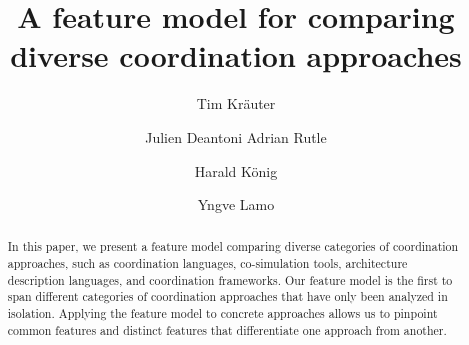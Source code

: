 \documentclass[runningheads]{llncs}
\begin{document}
\title{A feature model for comparing diverse coordination approaches}
%
%
\author{Tim Kr\"{a}uter \and
Julien Deantoni
Adrian Rutle \and
Harald K\"{o}nig \and
Yngve Lamo}
%
%
\maketitle

\begin{abstract}
In this paper, we present a feature model comparing diverse categories of coordination approaches, such as coordination languages, co-simulation tools, architecture description languages, and coordination frameworks.
Our feature model is the first to span different categories of coordination approaches that have only been analyzed in isolation.
Applying the feature model to concrete approaches allows us to pinpoint common features and distinct features that differentiate one approach from another.
\end{abstract}

\end{document}
